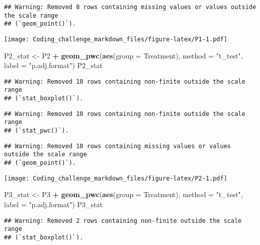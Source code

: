 \documentclass[
]{article}
\newenvironment{Shaded}{\begin{snugshade}}{\end{snugshade}}
\newcommand{\AttributeTok}[1]{\textcolor[rgb]{0.13,0.29,0.53}{#1}}
\newcommand{\FunctionTok}[1]{\textcolor[rgb]{0.13,0.29,0.53}{\textbf{#1}}}
\newcommand{\NormalTok}[1]{#1}
\newcommand{\OtherTok}[1]{\textcolor[rgb]{0.56,0.35,0.01}{#1}}
\newcommand{\SpecialCharTok}[1]{\textcolor[rgb]{0.81,0.36,0.00}{\textbf{#1}}}
\newcommand{\StringTok}[1]{\textcolor[rgb]{0.31,0.60,0.02}{#1}}
\begin{document}
\begin{verbatim}
## Warning: Removed 8 rows containing missing values or values outside the scale range
## (`geom_point()`).
\end{verbatim}

\texttt{[image: Coding\_challenge\_markdown\_files/figure-latex/P1-1.pdf]}

\begin{Shaded}
\begin{Highlighting}[]
\NormalTok{P2\_stat }\OtherTok{\textless{}{-}}\NormalTok{ P2 }\SpecialCharTok{+} 
  \FunctionTok{geom\_pwc}\NormalTok{(}\FunctionTok{aes}\NormalTok{(}\AttributeTok{group =}\NormalTok{ Treatment), }\AttributeTok{method =} \StringTok{"t\_test"}\NormalTok{, }\AttributeTok{label =} \StringTok{"p.adj.format"}\NormalTok{)}
\NormalTok{P2\_stat}
\end{Highlighting}
\end{Shaded}

\begin{verbatim}
## Warning: Removed 10 rows containing non-finite outside the scale range
## (`stat_boxplot()`).
\end{verbatim}

\begin{verbatim}
## Warning: Removed 10 rows containing non-finite outside the scale range
## (`stat_pwc()`).
\end{verbatim}

\begin{verbatim}
## Warning: Removed 10 rows containing missing values or values outside the scale range
## (`geom_point()`).
\end{verbatim}

\texttt{[image: Coding\_challenge\_markdown\_files/figure-latex/P2-1.pdf]}

\begin{Shaded}
\begin{Highlighting}[]
\NormalTok{P3\_stat }\OtherTok{\textless{}{-}}\NormalTok{ P3 }\SpecialCharTok{+} 
  \FunctionTok{geom\_pwc}\NormalTok{(}\FunctionTok{aes}\NormalTok{(}\AttributeTok{group =}\NormalTok{ Treatment), }\AttributeTok{method =} \StringTok{"t\_test"}\NormalTok{, }\AttributeTok{label =} \StringTok{"p.adj.format"}\NormalTok{)}
\NormalTok{P3\_stat}
\end{Highlighting}
\end{Shaded}

\begin{verbatim}
## Warning: Removed 2 rows containing non-finite outside the scale range
## (`stat_boxplot()`).
\end{verbatim}
\end{document}
